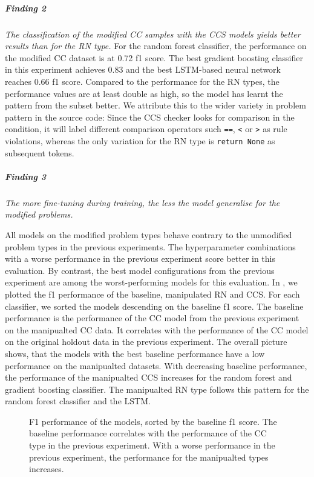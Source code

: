 \subparagraph{Finding 2}\label{finding:ccs_more_variety}
\textit{The classification of the modified CC samples with the CCS models yields better results than for the RN type.}
For the random forest classifier, the performance on the modified CC dataset is at 0.72 f1 score. The best gradient boosting classifier in this experiment achieves 0.83 and the best LSTM-based neural network reaches 0.66 f1 score. 
Compared to the performance for the RN types, the performance values are at least double as high, so the model has learnt the pattern from the subset better. We attribute this to the wider variety in problem pattern in the source code: Since the CCS checker looks for comparison in the condition, it will label different comparison operators such \texttt{==}, \texttt{<} or \texttt{>} as rule violations, whereas the only variation for the RN type is \texttt{return None} as subsequent tokens.

\subparagraph{Finding 3}\label{finding:better_vs_worse}
\textit{The more fine-tuning during training, the less the model generalise for the modified problems.}

All models on the modified problem types behave contrary to the unmodified problem types in the previous experiments. The hyperparameter combinations with a worse performance in the previous experiment score better in this evaluation. By contrast, the best model configurations from the previous experiment are among the worst-performing models for this evaluation. In , we plotted the f1 performance of the baseline, manipulated RN and CCS. For each classifier, we sorted the models descending on the baseline f1 score. The baseline performance is the performance of the CC model from the previous experiment on the manipualted CC data. It correlates with the performance of the CC model on the original holdout data in the previous experiment. The overall picture shows, that the models with the best baseline performance have a low performance on the manipualted datasets. With decreasing baseline performance, the performance of the manipualted CCS increases for the random forest and gradient boosting classifier. The manipualted RN type follows this pattern for the random forest classifier and the LSTM. 


\begin{figure}[h]
    \begin{center}
        
    \end{center}
    \caption[F1 performance of the models, sorted by the baseline f1 score.]{F1 performance of the models, sorted by the baseline f1 score. The baseline performance correlates with the performance of the CC type in the previous experiment. With a worse performance in the previous experiment, the performance for the manipualted types increases.}
    \label{fig:rq3_performance_comparison}
\end{figure}

